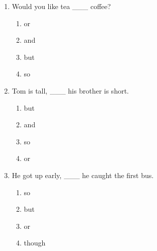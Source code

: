 \documentclass[11pt,a4paper]{ctexart}
\begin{document}
\begin{enumerate}[leftmargin=*,itemsep=4pt]
\item Would you like tea \_\_\_ coffee?
\begin{enumerate}[label=\Alph*.,leftmargin=2em,itemsep=1pt,topsep=2pt]
\item or
\item and
\item but
\item so
\end{enumerate}
\item Tom is tall, \_\_\_ his brother is short.
\begin{enumerate}[label=\Alph*.,leftmargin=2em,itemsep=1pt,topsep=2pt]
\item but
\item and
\item so
\item or
\end{enumerate}
\item He got up early, \_\_\_ he caught the first bus.
\begin{enumerate}[label=\Alph*.,leftmargin=2em,itemsep=1pt,topsep=2pt]
\item so
\item but
\item or
\item though
\end{enumerate}
\end{enumerate}
\end{document}
